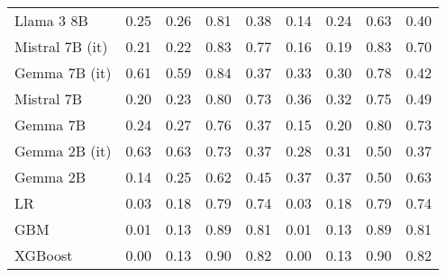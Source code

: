 \begin{tabular}{lllllllll}
Llama 3 8B & 0.25 & 0.26 & 0.81 & \cellcolor{orange!20.9} 0.38 & 0.14 & 0.24 & 0.63 & \cellcolor{orange!3.8} 0.40 \\
Mistral 7B (it) & 0.21 & \cellcolor{cyan!4.7} 0.22 & 0.83 & \cellcolor{cyan!9.2} 0.77 & 0.16 & 0.19 & \cellcolor{cyan!5.3} 0.83 & 0.70 \\
Gemma 7B (it) & \cellcolor{orange!14.7} 0.61 & \cellcolor{orange!4.7} 0.59 & 0.84 & \cellcolor{orange!25.0} 0.37 & 0.33 & 0.30 & 0.78 & 0.42 \\
Mistral 7B & 0.20 & 0.23 & 0.80 & 0.73 & \cellcolor{orange!15.7} 0.36 & 0.32 & 0.75 & 0.49 \\
Gemma 7B & 0.24 & 0.27 & 0.76 & \cellcolor{orange!25.0} 0.37 & 0.15 & 0.20 & 0.80 & 0.73 \\
Gemma 2B (it) & \cellcolor{orange!25.0} 0.63 & \cellcolor{orange!25.0} 0.63 & 0.73 & \cellcolor{orange!25.0} 0.37 & 0.28 & 0.31 & \cellcolor{orange!25.0} 0.50 & \cellcolor{orange!25.0} 0.37 \\
Gemma 2B & \cellcolor{cyan!25.0} 0.14 & 0.25 & \cellcolor{orange!25.0} 0.62 & 0.45 & \cellcolor{orange!25.0} 0.37 & \cellcolor{orange!25.0} 0.37 & \cellcolor{orange!25.0} 0.50 & 0.63 \\
LR & 0.03 & 0.18 & 0.79 & 0.74 & 0.03 & 0.18 & 0.79 & 0.74 \\
GBM & 0.01 & 0.13 & 0.89 & 0.81 & 0.01 & 0.13 & 0.89 & 0.81 \\
XGBoost & 0.00 & 0.13 & 0.90 & 0.82 & 0.00 & 0.13 & 0.90 & 0.82 \\
\bottomrule
\end{tabular}

